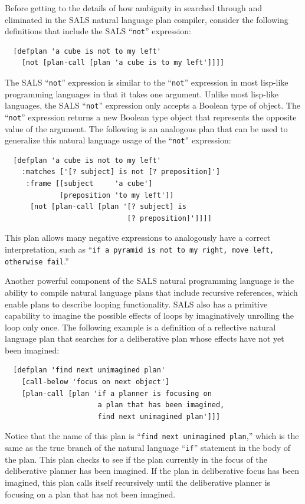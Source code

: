 Before getting to the details of how ambiguity in searched through and
eliminated in the SALS natural language plan compiler, consider the
following definitions that include the SALS ``{\tt{not}}'' expression:
\begin{samepage}
\begin{Verbatim}
  [defplan 'a cube is not to my left'
    [not [plan-call [plan 'a cube is to my left']]]]
\end{Verbatim}
\end{samepage}
The SALS ``{\tt{not}}'' expression is similar to the ``{\tt{not}}''
expression in most lisp-like programming languages in that it takes
one argument.  Unlike most lisp-like languages, the SALS
``{\tt{not}}'' expression only accepts a Boolean type of object.  The
``{\tt{not}}'' expression returns a new Boolean type object that
represents the opposite value of the argument.  The following is an
analogous plan that can be used to generalize this natural language
usage of the ``{\tt{not}}'' expression:
\begin{samepage}
\begin{Verbatim}
  [defplan 'a cube is not to my left'
    :matches ['[? subject] is not [? preposition]']
     :frame [[subject     'a cube']
             [preposition 'to my left']]
      [not [plan-call [plan '[? subject] is
                             [? preposition]']]]]
\end{Verbatim}
\end{samepage}
This plan allows many negative expressions to analogously have a
correct interpretation, such as ``{\tt{if a pyramid is not to my
    right, move left, otherwise fail}}.''

Another powerful component of the SALS natural programming language is
the ability to compile natural language plans that include recursive
references, which enable plans to describe looping functionality.
SALS also has a primitive capability to imagine the possible effects
of loops by imaginatively unrolling the loop only once.  The following
example is a definition of a reflective natural language plan that
searches for a deliberative plan whose effects have not yet been
imagined:
\begin{samepage}
\begin{Verbatim}
  [defplan 'find next unimagined plan'
    [call-below 'focus on next object']
    [plan-call [plan 'if a planner is focusing on
                      a plan that has been imagined,
                      find next unimagined plan']]]
\end{Verbatim}
\end{samepage}
Notice that the name of this plan is ``{\tt{find next unimagined
    plan}},'' which is the same as the true branch of the natural
language ``{\tt{if}}'' statement in the body of the plan.  This plan
checks to see if the plan currently in the focus of the deliberative
planner has been imagined.  If the plan in deliberative focus has been
imagined, this plan calls itself recursively until the deliberative
planner is focusing on a plan that has not been imagined.

